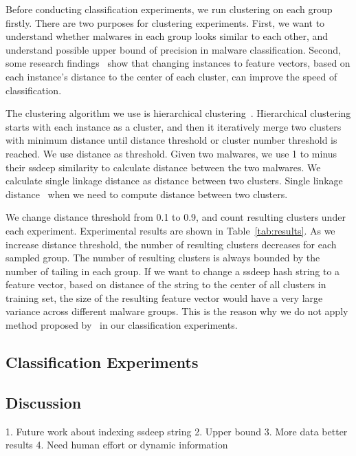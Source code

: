 Before conducting classification experiments, 
we run clustering on each group firstly. 
There are two purposes for clustering experiments.
First, we want to understand whether malwares in each group looks similar to each other, 
and understand possible upper bound of precision in malware classification.
Second, some research findings~\cite{clustering-purpose} show that changing instances to feature vectors, 
based on each instance’s distance to the center of each cluster, 
can improve the speed of classification.  

The clustering algorithm we use is hierarchical clustering~\cite{hcluster}.
Hierarchical clustering starts with each instance as a cluster, 
and then it iteratively merge two clusters with minimum distance 
until distance threshold or cluster number threshold is reached. 
We use distance as threshold. 
Given two malwares, 
we use 1 to minus their ssdeep similarity to calculate distance between the two malwares. 
We calculate single linkage distance as distance between two clusters. 
Single linkage
distance~\cite{single-link} when we need to compute distance between two clusters. 

We change distance threshold from 0.1 to 0.9, 
and count resulting clusters under each experiment. 
Experimental results are shown in Table~\ref{tab:results}. 
As we increase distance threshold, the number of resulting clusters decreases for each sampled group. 
The number of resulting clusters is always bounded by the number of tailing in each group. 
If we want to change a ssdeep hash string to a feature vector, 
based on distance of the string to the center of all clusters in training set, 
the size of the resulting feature vector would have a very large variance across different malware groups. 
This is the reason why we do not apply method proposed by~\citet{clustering-purpose} in our classification experiments. 



\subsection{Classification Experiments}


\subsection{Discussion}
1. Future work about indexing ssdeep string
2. Upper bound
3. More data better results
4. Need human effort or dynamic information 